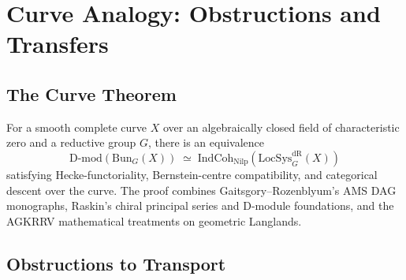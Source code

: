 \section{Curve Analogy: Obstructions and Transfers}
\label{v4-arith:acd:function-field-transport}

\subsection{The Curve Theorem}

\begin{theorem}
\label{v4-arith:acd:thm:FF-geom-langlands}
For a smooth complete curve \(X\) over an
algebraically closed field of characteristic zero and a reductive group
\(G\),
there is an equivalence
\begin{equation}
\mathrm{D}\text{-}\mathrm{mod}(\mathrm{Bun}_{G}(X))\;\simeq\;\mathrm{IndCoh}_{\mathrm{Nilp}}(\mathrm{LocSys}^{\mathrm{dR}}_{G}(X))
\end{equation}
satisfying Hecke-functoriality, Bernstein-centre compatibility, and
categorical descent over the curve. The proof combines
Gaitsgory--Rozenblyum's AMS DAG monographs, Raskin's chiral principal
series and D-module foundations, and the AGKRRV mathematical treatments on geometric
Langlands.
\end{theorem}

\subsection{Obstructions to Transport}

